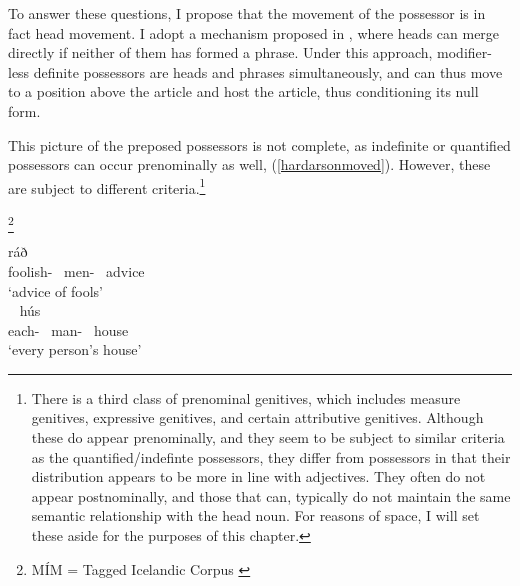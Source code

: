 \documentclass[output=paper]{langscibook}
\begin{document}
To answer these questions, I propose that the movement of the possessor is in fact head movement. I adopt a mechanism proposed in \citet{hardarson2020}, where heads can merge directly if neither of them has formed a phrase. Under this approach, modifier-less definite possessors are heads and phrases simultaneously, and can thus move to a position above the article and host the article, thus conditioning its null form.

This picture of the preposed possessors is not complete, as indefinite or quantified possessors can occur prenominally as well, (\ref{hardarsonmoved}). However, these are subject to different criteria.\footnote{There is a third class of prenominal genitives, which includes measure genitives, expressive genitives, and certain attributive genitives. Although these do appear prenominally, and they seem to be subject to similar criteria as the quantified/indefinte possessors, they differ from possessors in that their distribution appears to be more in line with adjectives. They often do not appear postnominally, and those that can, typically do not maintain the same semantic relationship with the head noun. For reasons of space, I will set these aside for the purposes of this chapter.}

\begin{exe}
		\begin{multicols}{2}
	\ex	{[MÍM]}\footnote{M{\'I}M = Tagged Icelandic Corpus \citep{helgadottir2012}} \label{hardarsonmoved} %
		\begin{xlist}
			\ex	{} ráð\\
						foolish-\hardGen~ men-\hardGen~ advice\\
				\glt	`advice of fools'\\~
			\ex	\gll	[hver-s mann-s] hús\\
						each-\hardGen~ man-\hardGen~ house\\
				\glt	`every person's house'
		\end{xlist}
				\end{multicols}
\end{exe}
\end{document}
